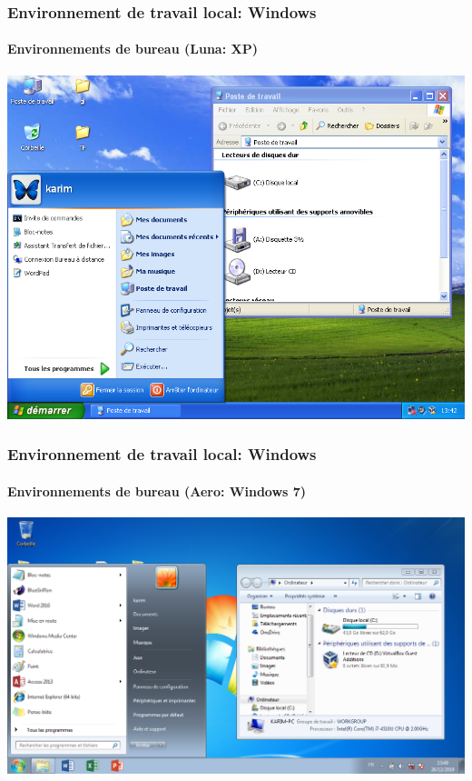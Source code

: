 \documentclass{beamer}
\begin{document}
\begin{frame}
\frametitle{Environnement de travail local: Windows}
\framesubtitle{Environnements de bureau (Luna: XP)}

\begin{center}
	\includegraphics[height=
	.8\textheight]{../img/Bweb01-environnement/xp.png}
\end{center}

\end{frame}

\begin{frame}
\frametitle{Environnement de travail local: Windows}
\framesubtitle{Environnements de bureau (Aero: Windows 7)}

\begin{center}
	\includegraphics[height=
	.8\textheight]{../img/Bweb01-environnement/win7.png}
\end{center}

\end{frame}
\end{document}
